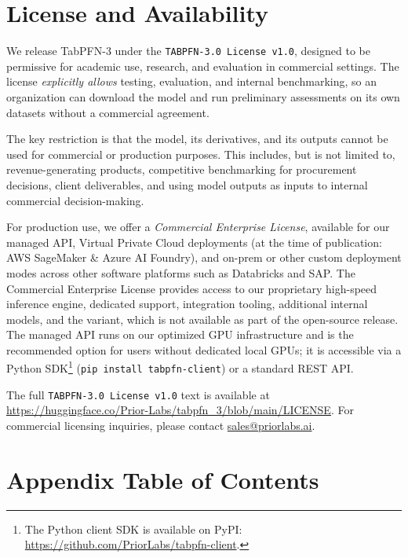\section{License and Availability}\label{sec:license}We release TabPFN-3 under the \texttt{TABPFN-3.0 License v1.0}, designed to be permissive for academic use, research, and evaluation in commercial settings. The license \emph{explicitly allows} testing, evaluation, and internal benchmarking, so an organization can download the model and run preliminary assessments on its own datasets without a commercial agreement.

The key restriction is that the model, its derivatives, and its outputs cannot be used for commercial or production purposes. This includes, but is not limited to, revenue-generating products, competitive benchmarking for procurement decisions, client deliverables, and using model outputs as inputs to internal commercial decision-making.

For production use, we offer a \emph{Commercial Enterprise License}, available for our managed API, Virtual Private Cloud deployments (at the time of publication: AWS SageMaker \& Azure AI Foundry), and on-prem or other custom deployment modes across other software platforms such as Databricks and SAP. The Commercial Enterprise License provides access to our proprietary high-speed inference engine, dedicated support, integration tooling, additional internal models, and the \ourmodelenhanced variant, which is not available as part of the open-source release. The managed API runs on our optimized GPU infrastructure and is the recommended option for users without dedicated local GPUs; it is accessible via a Python SDK\footnote{The Python client SDK is available on PyPI: \url{https://github.com/PriorLabs/tabpfn-client}.} (\texttt{pip install tabpfn-client}) or a standard REST API.

The full \texttt{TABPFN-3.0 License v1.0} text is available at \url{https://huggingface.co/Prior-Labs/tabpfn_3/blob/main/LICENSE}. For commercial licensing inquiries, please contact \href{mailto:sales@priorlabs.ai}{sales@priorlabs.ai}.

\newpage





\FloatBarrier
 


          


\newpage
\appendix

{}


\section*{Appendix Table of Contents}
\startcontents[appendix]
\makeatletter
\protected@write{}
\makeatother
{}
\newpage

